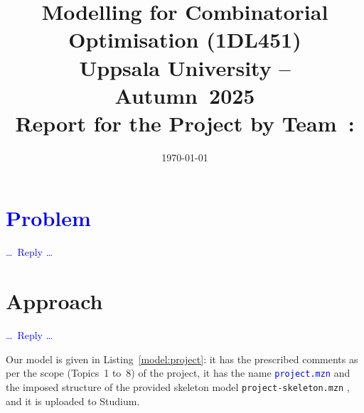 \documentclass[a4paper,11pt,hidelinks]{article}
\title{\textbf{Modelling for Combinatorial Optimisation (1DL451) \\
    Uppsala University -- Autumn~2025 \\
    Report for the Project
    by Team~\todo{t}: \\                      %
    \Problem
  }
}
\author{\todo{Clara CLÄVER and Whiz KIDD}}
\date{\today}
\renewcommand{\todo}[1]{\textcolor{blue}{#1}} %
\newcommand{\Problem}{\todo{Problem}\xspace}  %
\begin{document}
\maketitle


\section{\Problem}


\todo{\dots\ Reply \dots}


\section{Approach}


\todo{\dots\ Reply \dots}

Our model is given in Listing~\ref{model:project}: it has the
prescribed comments as per the scope (Topics~1 to~8) of the project,
it has the name \todo{\texttt{project.mzn}}             %
and the imposed structure of the provided skeleton model
\texttt{project-skeleton.mzn}%
, and it is uploaded to Studium.

\end{document}
